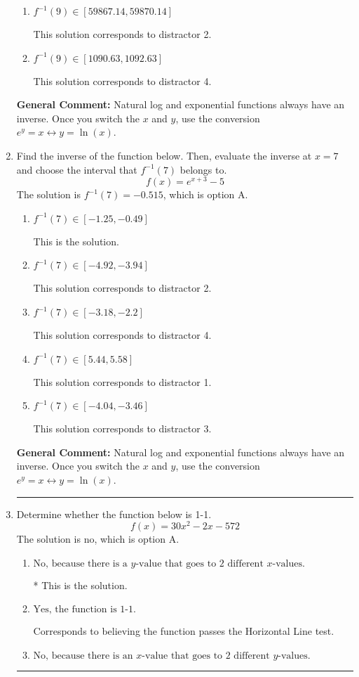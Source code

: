 \documentclass{extbook}[14pt]
\newcommand{\litem}[1]{\item #1

\rule{\textwidth}{0.4pt}}
\begin{document}
\begin{enumerate}
{\begin{enumerate}[label=\Alph*.]
 This is the solution.
\item \( f^{-1}(9) \in [59867.14, 59870.14] \)

 This solution corresponds to distractor 2.
\item \( f^{-1}(9) \in [1090.63, 1092.63] \)

 This solution corresponds to distractor 4.
\end{enumerate}

\textbf{General Comment:} Natural log and exponential functions always have an inverse. Once you switch the $x$ and $y$, use the conversion $ e^y = x \leftrightarrow y=\ln(x)$.
}
\litem{
Find the inverse of the function below. Then, evaluate the inverse at $x = 7$ and choose the interval that $f^{-1}(7)$ belongs to.
\[ f(x) = e^{x+3}-5 \]The solution is \( f^{-1}(7) = -0.515 \), which is option A.\begin{enumerate}[label=\Alph*.]
\item \( f^{-1}(7) \in [-1.25, -0.49] \)

 This is the solution.
\item \( f^{-1}(7) \in [-4.92, -3.94] \)

 This solution corresponds to distractor 2.
\item \( f^{-1}(7) \in [-3.18, -2.2] \)

 This solution corresponds to distractor 4.
\item \( f^{-1}(7) \in [5.44, 5.58] \)

 This solution corresponds to distractor 1.
\item \( f^{-1}(7) \in [-4.04, -3.46] \)

 This solution corresponds to distractor 3.
\end{enumerate}

\textbf{General Comment:} Natural log and exponential functions always have an inverse. Once you switch the $x$ and $y$, use the conversion $ e^y = x \leftrightarrow y=\ln(x)$.
}
\litem{
Determine whether the function below is 1-1.
\[ f(x) = 30 x^2 - 2 x - 572 \]The solution is \( \text{no} \), which is option A.\begin{enumerate}[label=\Alph*.]
\item \( \text{No, because there is a $y$-value that goes to 2 different $x$-values.} \)

* This is the solution.
\item \( \text{Yes, the function is 1-1.} \)

Corresponds to believing the function passes the Horizontal Line test.
\item \( \text{No, because there is an $x$-value that goes to 2 different $y$-values.} \)


\end{enumerate}}
\end{enumerate}
\end{document}
